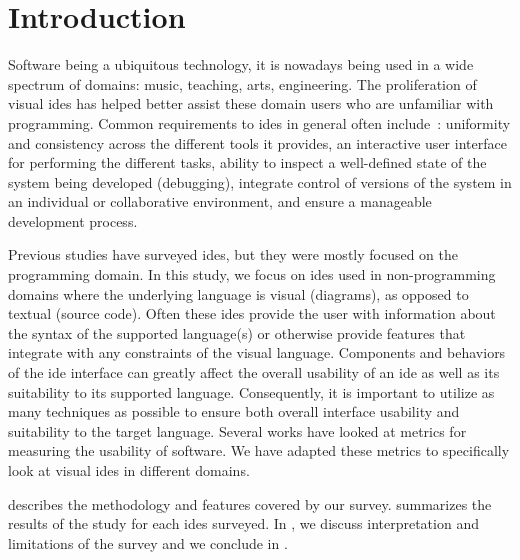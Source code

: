 \section{Introduction} \label{sec:introduction}

Software being a ubiquitous technology, it is nowadays being used in a wide spectrum of domains: music, teaching, arts, engineering.
The proliferation of visual \acfp{ide} has helped better assist these domain users who are unfamiliar with programming.
Common requirements to \acp{ide} in general often include~\cite{habermann1986}: uniformity and consistency across the different tools it provides, an interactive user interface for performing the different tasks, ability to inspect a well-defined state of the system being developed (\eg debugging), integrate control of versions of the system in an individual or collaborative environment, and ensure a manageable development process.

Previous studies have surveyed \acp{ide}, but they were mostly focused on the
programming domain. \cite{hils1992, fischer1994, habermann1986}
In this study, we focus on \acp{ide} used in non-programming domains where the underlying language is visual (\eg diagrams), as opposed to textual (\eg source code).
Often these \acp{ide} provide the user with information about the syntax of the supported language(s) or otherwise provide features that integrate with any constraints of the visual language.
Components and behaviors of the \ac{ide} interface can greatly affect the overall usability of an \ac{ide} as well as its suitability to its supported language.
Consequently, it is important to utilize as many techniques as possible to ensure both overall interface usability and suitability to the target language.
Several works have looked at metrics for measuring the usability of
software. \cite{constantine1996}
We have adapted these metrics to specifically look at visual \acp{ide} in different domains.

 describes the methodology and features covered by our survey.
 summarizes the results of the study for each \acp{ide} surveyed.
In , we discuss interpretation and limitations of the survey and we conclude in .

